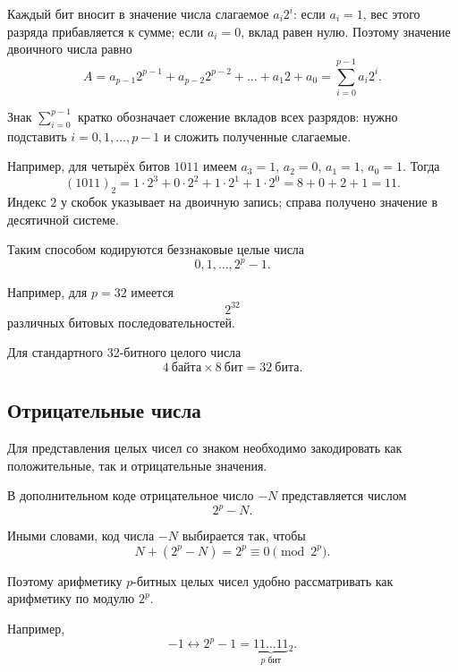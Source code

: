 \documentclass[../final.tex]{subfiles}
\begin{document}
Каждый бит вносит в значение числа слагаемое $a_i2^i$:
если $a_i=1$, вес этого разряда прибавляется к сумме;
если $a_i=0$, вклад равен нулю. Поэтому значение двоичного числа равно
%
\begin{equation*}
    A
    =
    a_{p-1}2^{p-1}
    +
    a_{p-2}2^{p-2}
    +\ldots+
    a_1 2
    +
    a_0
    =
    \sum_{i=0}^{p-1} a_i2^i.
\end{equation*}

Знак $\sum_{i=0}^{p-1}$ кратко обозначает сложение вкладов всех
разрядов: нужно подставить $i=0,1,\ldots,p-1$ и сложить
полученные слагаемые.

Например, для четырёх битов $1011$ имеем
$a_3=1$, $a_2=0$, $a_1=1$, $a_0=1$. Тогда
%
\[
    (1011)_2
    =1\cdot2^3+0\cdot2^2+1\cdot2^1+1\cdot2^0
    =8+0+2+1=11.
\]
%
Индекс $2$ у скобок указывает на двоичную запись;
справа получено значение в десятичной системе.

Таким способом кодируются беззнаковые целые числа
%
\[
    0,1,\ldots,2^p-1.
\]

Например, для $p=32$ имеется
%
\[
    2^{32}
\]
%
различных битовых последовательностей.

Для стандартного 32-битного целого числа
%
\[
    4\ \text{байта}\times8\ \text{бит}
    =
    32\ \text{бита}.
\]


\subsection{Отрицательные числа}

Для представления целых чисел со знаком необходимо закодировать
как положительные, так и отрицательные значения.

В дополнительном коде отрицательное число $-N$ представляется
числом
%
\begin{equation*}
    2^p-N.
\end{equation*}

Иными словами, код числа $-N$ выбирается так, чтобы
%
\begin{equation*}
    N + (2^p-N)
    =
    2^p
    \equiv
    0
    \pmod{2^p}.
\end{equation*}

Поэтому арифметику $p$-битных целых чисел удобно рассматривать
как арифметику по модулю $2^p$.

Например,
%
\begin{equation*}
    -1
    \longleftrightarrow
    2^p-1
    =
    \underbrace{11\ldots11}_{p\text{ бит}}{}_2 .
\end{equation*}
\end{document}
